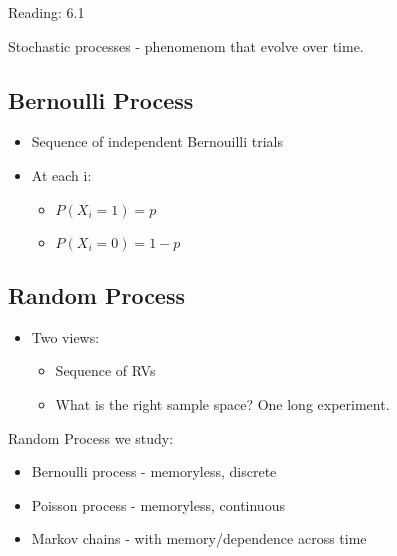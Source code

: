  Reading: 6.1

Stochastic processes - phenomenom that evolve over time.


\subsection{Bernoulli Process}

\begin{itemize}
    \item Sequence of independent Bernouilli trials
    \item At each i:
    \begin{itemize}
        \item $P(X_i=1)=p$
        \item $P(X_i=0)=1-p$
    \end{itemize}
\end{itemize}

\subsection{Random Process}


\begin{itemize}
    \item Two views:
    \begin{itemize}
        \item Sequence of RVs
        \item What is the right sample space?  One long experiment.
    \end{itemize}
\end{itemize}


Random Process we study:
\begin{itemize}
    \item Bernoulli process - memoryless, discrete
    \item Poisson process - memoryless, continuous
     \item Markov chains - with memory/dependence across time
\end{itemize}


